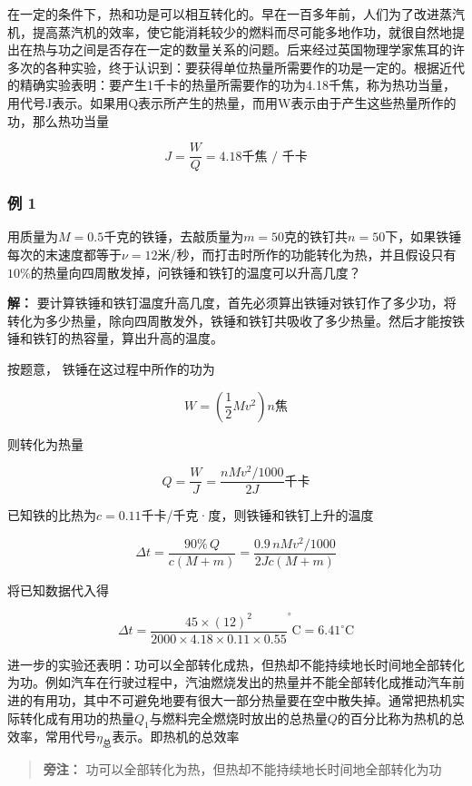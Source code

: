在一定的条件下，热和功是可以相互转化的。早在一百多年前，人们为了改进蒸汽机，提高蒸汽机的效率，使它能消耗较少的燃料而尽可能多地作功，就很自然地提出在热与功之间是否存在一定的数量关系的问题。后来经过英国物理学家焦耳的许多次的各种实验，终于认识到：要获得单位热量所需要作的功是一定的。根据近代的精确实验表明：要产生1千卡的热量所需要作的功为4.18千焦，称为热功当量，用代号J表示。如果用Q表示所产生的热量，而用W表示由于产生这些热量所作的功，那么热功当量

\[
J = \frac {W}{Q} = 4.18 \text{千焦 / 千卡} \tag {9.1}
\]

\subsubsection{例 1}\label{ux4f8b-1-9}

用质量为\(M = 0.5\)千克的铁锤，去敲质量为\(m = 50\)克的铁钉共\(n = 50\)下，如果铁锤每次的末速度都等于\(\nu = 12\)米/秒，而打击时所作的功能转化为热，并且假设只有\(10\%\)的热量向四周散发掉，问铁锤和铁钉的温度可以升高几度？

\textbf{解：}
要计算铁锤和铁钉温度升高几度，首先必须算出铁锤对铁钉作了多少功，将转化为多少热量，除向四周散发外，铁锤和铁钉共吸收了多少热量。然后才能按铁锤和铁钉的热容量，算出升高的温度。

按题意， 铁锤在这过程中所作的功为

\[
W = \left(\frac {1}{2} M v ^ {2}\right) n \text{焦}
\]

则转化为热量

\[
Q = \frac {W}{J} = \frac {n M v ^ {2} / 1000}{2 J} \text{千卡}
\]

已知铁的比热为\(c = 0.11\)千卡/千克·度，则铁锤和铁钉上升的温度

\[
\Delta t=\frac{90\%\,Q}{c(M+m)}=\frac{0.9\,nMv^2/1000}{2Jc(M+m)}
\]

将已知数据代入得

\[
\Delta t = \frac {45 \times (12) ^ {2}}{2000 \times 4.18 \times 0.11 \times 0.55} ^ {\circ} \mathrm{C} = 6.41 ^ {\circ} \mathrm{C}
\]

进一步的实验还表明：功可以全部转化成热，但热却不能持续地长时间地全部转化为功。例如汽车在行驶过程中，汽油燃烧发出的热量并不能全部转化成推动汽车前进的有用功，其中不可避免地要有很大一部分热量要在空中散失掉。通常把热机实际转化成有用功的热量\(Q_{1}\)与燃料完全燃烧时放出的总热量\(Q\)的百分比称为热机的总效率，常用代号\(\eta_{\text{总}}\)表示。即热机的总效率

\begin{quote}
\textbf{旁注：} 功可以全部转化为热，但热却不能持续地长时间地全部转化为功
\end{quote}

